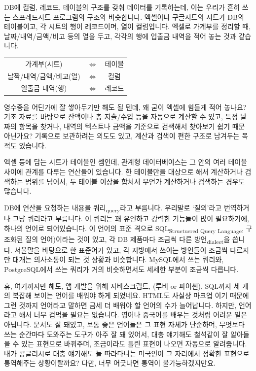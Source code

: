 \documentclass[11pt,a4paper]{article}
\newcommand{\sub}[1]{\textsubscript{#1}}
\begin{document}
DB에 컬럼, 레코드, 테이블의 구조를 갖춰 데이터를 기록하는데, 이는 우리가 흔히 쓰는 스프레드시트 프로그램의 구조와 비슷합니다. 엑셀이나 구글시트의 시트가 DB의 테이블이고, 각 시트의 행이 레코드이며, 열이 컬럼입니다. 엑셀로 가계부를 정리할 때, 날짜/내역/금액/비고 등의 열을 두고, 각각의 행에 입출금 내역을 적어 놓는 것과 같습니다.

\begin{tabular}{|ccc|}
  \hline
  가계부(시트) & $\Leftrightarrow$ & 테이블  \\
  날짝/내역/금액/비고(열) & $\Leftrightarrow$ & 컬럼 \\
  일출금 내역(행) & $\Leftrightarrow$ & 레코드 \\
  \hline
\end{tabular}

영수증을 어딘가에 잘 쌓아두기만 해도 될 텐데, 왜 굳이 엑셀에 힘들게 적어 놓나요? 기초 자료를 바탕으로 잔액이나 총 지출/수입 등을 자동으로 계산할 수 있고, 특정 날짜의 항목을 찾거나, 내역의 텍스트나 금액을 기준으로 검색해서 찾아보기 쉽기 때문 아닌가요? 기록으로 보관하려는 의도도 있고, 계산과 검색이 편한 구조로 남겨두는 목적도 있습니다.

엑셀 등에 담는 시트가 테이블인 셈인데, 관계형 데이터베이스는 그 안의 여러 테이블 사이에 관계를 다루는 연산들이 있습니다. 한 테이블만을 대상으로 해서 계산하거나 검색하는 범위를 넘어서, 두 테이블 이상을 합쳐서 무언가 계산하거나 검색하는 경우도 많습니다.

DB에 연산을 요청하는 내용을 쿼리\sub{query}라고 부릅니다. 우리말로 `질의'라고 번역하거나 그냥 쿼리라고 부릅니다. 이 쿼리는 꽤 유연하고 강력한 기능들이 많이 필요하기에, 하나의 언어로 되어있습니다. 이 언어의 표준 격으로  SQL\sub{Structuered Query Language}, 구조화된 질의 언어)이라는 것이 있고, 각 DB 제품마다 조금씩 다른 방언\sub{dialect}을 씁니다. 서울말을 바탕으로 한 표준어가 있고, 각 지방에서 쓰이는 방언들이 조금씩 다르지만 대개는 의사소통이 되는 것 상황과 비슷합니다. MySQL에서 쓰는 쿼리와, PostgreSQL에서 쓰는 쿼리가 거의 비슷하면서도 세세한 부분이 조금씩 다릅니다.

휴, 여기까지만 해도, 앱 개발을 위해 자바스크립트, (루비 or 파이썬), SQL까지 세 개의 복잡해 보이는 언어를 배워야 하게 되었네요. HTML도 사실상 마크업 이기 때문에 그런 것까지 언어라고 말하면 금세 더 배워야 할 언어의 수가 늘어납니다. 하지만, 언어라고 해서 너무 겁먹을 필요는 없습니다. 영어나 중국어를 배우는 것처럼 어려운 일은 아닙니다. 문서도 잘 돼있고, 보통 좋은 언어들은 그 표현 자체가 단순하며, 무엇보다 쓰는 순간마다 도와주는 도구가 아주 잘 돼 있어서, 대충 얘기해도 철석같이 잘 알아들을 수 있는 표현으로 바꿔주며, 조금이라도 틀린 표현이 나오면 자동으로 알려줍니다. 내가 콩글리시로 대충 얘기해도 늘 따라다니는 미국인이 그 자리에서 정확한 표현으로 통역해주는 상황이랄까요? 다만, 너무 어긋나면 통역이 불가능하겠지만요.
\end{document}
